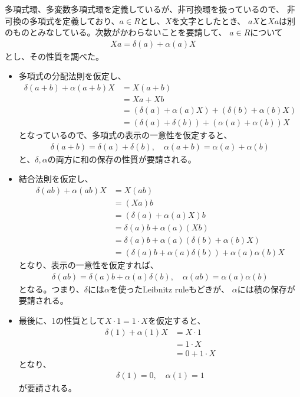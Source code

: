 \documentclass[9pt]{ltjsarticle}
\begin{document}
多項式環、多変数多項式環を定義しているが、非可換環を扱っているので、
非可換の多項式を定義しており、$a\in R$とし、$X$を文字としたとき、
$aX$と$Xa$は別のものとみなしている。次数がかわらないことを要請して、
$a\in R$について
\begin{align}
  Xa = \delta(a)  + \alpha(a)X
\end{align}
とし、その性質を調べた。
\begin{itemize}
  \item 多項式の分配法則を仮定し、
  \begin{align}
    \delta(a+b) + \alpha(a+b)X
    &=
    X(a+b)\\
    &=
    Xa + Xb\\
    &=
    (\delta(a) + \alpha(a)X) + (\delta(b) + \alpha(b)X)\\
    &=
    (\delta(a)+\delta(b)) + (\alpha(a)+\alpha(b))X
  \end{align}
  となっているので、多項式の表示の一意性を仮定すると、
  \begin{align}
    \delta(a+b) = \delta(a) + \delta(b),\quad \alpha(a+b) = \alpha(a) + \alpha(b)
  \end{align}
  と、$\delta,\alpha$の両方に和の保存の性質が要請される。
  \item 結合法則を仮定し、
  \begin{align}
    \delta(ab ) + \alpha(ab)X
    &=
    X(ab)\\
    &=
    (Xa)b\\
    &=
    (\delta(a) + \alpha(a)X)b\\
    &=
    \delta(a)b + \alpha(a)(Xb)\\
    &=
    \delta(a)b + \alpha(a)(\delta(b)+\alpha(b)X)\\
    &=
    (\delta(a)b + \alpha(a)\delta(b)) + \alpha(a)\alpha(b)X
  \end{align}
  となり、表示の一意性を仮定すれば、
  \begin{align}
    \delta(ab) = \delta(a)b + \alpha(a)\delta(b),\quad \alpha(ab) = \alpha(a)\alpha(b)
  \end{align}
  となる。つまり、$\delta$には$\alpha$を使ったLeibnitz ruleもどきが、
  $\alpha$には積の保存が要請される。
  \item 最後に、1の性質として$X\cdot 1 = 1\cdot X$を仮定すると、
  \begin{align}
    \delta(1) + \alpha(1)X
    &=
    X\cdot 1\\
    &=
    1\cdot X\\
    &=
    0 + 1\cdot X
  \end{align}
  となり、
  \begin{align}
    \delta(1) = 0,\quad \alpha(1) = 1
  \end{align}
  が要請される。
\end{itemize}
\end{document}
